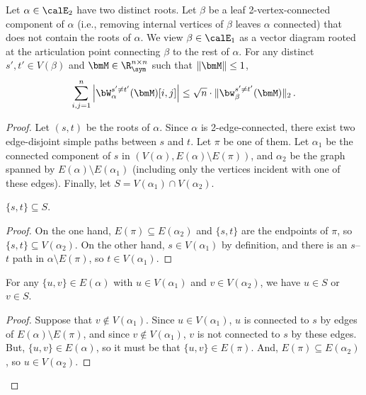 \begin{lemma}
    \label{lem:abs-value-pushed}
    Let $\alpha\in \calE_2$ have two distinct roots. Let $\beta$
    be a leaf 2-vertex-connected component of $\alpha$
    (i.e., removing internal vertices of $\beta$ leaves $\alpha$
    connected) that does not contain the roots
    of $\alpha$.
    We view $\beta\in\calE_1$ as a vector
    diagram rooted at the articulation point
    connecting $\beta$ to the rest of $\alpha$.
    For any distinct $s',t'\in V(\beta)$ and $\bmM\in \R^{n\times n}_\sym$
    such that $\|\bmM\|\le 1$,
    \[
        \sum_{i,j=1}^n \left|\bW_\alpha^{s'\neq t'}(\bmM)[i,j]\right|\le \sqrt n \cdot \|\bw^{s'\neq t'}_\beta(\bmM)\|_2\,.
    \]
\end{lemma}

\begin{proof}
    Let $(s,t)$ be the roots of $\alpha$.
    Since $\alpha$ is 2-edge-connected, there
    exist two edge-disjoint simple paths 
    between $s$
    and $t$. Let $\pi$ be one of them. Let
    $\alpha_1$ be the connected component of $s$
    in 
    $(V(\alpha),E(\alpha)\setminus E(\pi))$, and
    $\alpha_2$ be the graph spanned by $E(\alpha)\setminus E(\alpha_1)$ (including only the vertices incident with one of these edges).
    Finally, let
    $S = V(\alpha_1)\cap V(\alpha_2)$.

    \begin{claim}
        $\{s,t\}\subseteq S$.
    \end{claim}

    \begin{proof}
        On the one hand, $E(\pi)\subseteq E(\alpha_2)$ and $\{s,t\}$
        are the endpoints of $\pi$, so $\{s,t\}\subseteq V(\alpha_2)$. On the other
        hand, $s\in V(\alpha_1)$ by definition, and there is an $s$--$t$ path
        in $\alpha\setminus E(\pi)$, so $t\in V(\alpha_1)$.
    \end{proof}

    \begin{claim}
        \label{obs:makes-sense}
        For any $\{u,v\}\in E(\alpha)$ with
        $u\in V(\alpha_1)$ and $v\in V(\alpha_2)$, we have $u\in S$ or $v\in S$.
    \end{claim}

    \begin{proof}
        Suppose that
        $v\notin V(\alpha_1)$. 
        Since $u \in V(\alpha_1)$, $u$ is connected to $s$ by edges of $E(\alpha) \setminus E(\pi)$, and since $v \notin V(\alpha_1)$, $v$ is not connected to $s$ by these edges.
        But, $\{u, v\} \in E(\alpha)$, so it must be that $\{u, v\} \in E(\pi)$.
        And, $E(\pi) \subseteq E(\alpha_2)$, so
        $u\in V(\alpha_2)$.
    \end{proof}
    

\end{proof}
